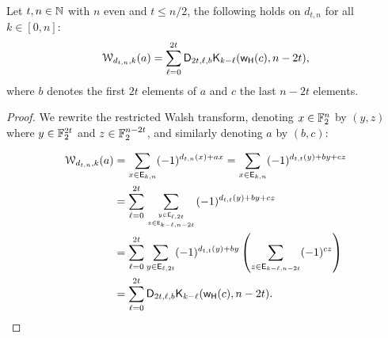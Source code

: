 \documentclass[11pt]{llncs}
\begin{document}
\begin{proposition}\label{prop:dtn}
	Let $t, n\in \mathbb{N}$ with $n$ even and $t\le n/2$, the following holds on $d_{t,n}$ for all $k\in [0,n]$:
	\[\mathcal{W}_{d_{t,n},k}(a)=\sum_{\ell=0}^{2t} \mathsf{D}_{2t,\ell,b} \mathsf{K}_{k-\ell}(\mathsf{w_H}(c),n-2t),\]
	where $b$ denotes the first $2t$ elements of $a$ and $c$ the last $n-2t$ elements.
	
	
	
	
	
\end{proposition}
\begin{proof}
	We rewrite the restricted Walsh transform, denoting $x\in \mathbb{F}_2^n$ by $(y,z)$ where $y\in \mathbb{F}_2^{2t}$ and $z \in \mathbb{F}_2^{n-2t}$, and similarly denoting $a$ by $(b,c)$:
	
	\begin{align*}
	\mathcal{W}_{d_{t,n},k}(a)&=\sum_{x \in \mathsf{E}_{k,n}} (-1)^{d_{t,n}(x)+ax}=\sum_{x \in \mathsf{E}_{k,n}} (-1)^{d_{t,t}(y)+by +cz}\\
	&=\sum_{\ell=0}^{2t} \sum_{y \in \mathsf{E}_{\ell,2t} \atop z \in \mathsf{E}_{k-\ell,n-2t}} (-1)^{d_{t,t}(y)+by +cz}\\
	&=\sum_{\ell=0}^{2t} \sum_{y \in \mathsf{E}_{\ell,2t}} (-1)^{d_{t,t}(y)+by} \left( \sum_{z \in \mathsf{E}_{k-\ell,n-2t}} (-1)^{cz}\right)\\
	&=\sum_{\ell=0}^{2t} \mathsf{D}_{2t,\ell,b} \mathsf{K}_{k-\ell}(\mathsf{w_H}(c),n-2t).
	\end{align*}	
	
	
\end{proof}

\newpage



\ifnum{}


\else


\fi
\end{document}
